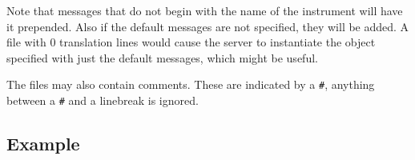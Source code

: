 \documentclass[12pt]{article}
\begin{document}
Note that messages that do not begin with the name of the instrument will have it prepended. Also if the default messages are not specified, 
they will be added. A file with 0 translation lines would cause the server to instantiate the object specified with just the default messages, which might be useful.

The files may also contain comments. These are indicated by a \texttt{\#}, anything between a \texttt{\#} and a linebreak is ignored.

%	
%	
%	
%	
%	
%	
%	
%	
%	
%	
%	
%	
%	
%	
%	
%	
%	
%	
%	
%	
%	
%
%

\subsection{Example}
\end{document}
